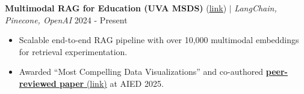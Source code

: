 \documentclass[letterpaper,11pt]{article}
\begin{document}
{\textbf{Multimodal RAG for Education (UVA MSDS)} (\href{https://github.com/MSDS-Capstone-Project/MultiModalRAG}{\underline{link}}) $|$ \emph{LangChain, Pinecone, OpenAI}} \hfill{2024 - Present}\vspace{-4pt}
\begin{itemize}[leftmargin=0.18in, itemsep=1px, parsep=0pt]
\item Scalable end-to-end RAG pipeline with over 10,000 multimodal embeddings for retrieval experimentation.
\item{Awarded “Most Compelling Data Visualizations” and co-authored \href{\paperlink}{\textbf{peer-reviewed paper} ({\underline{link}})} at AIED 2025.}
\end{itemize}\vspace{-0pt}










\end{document}

